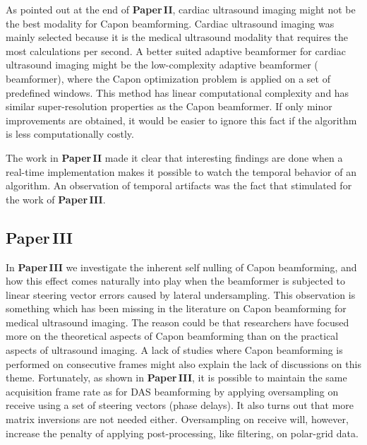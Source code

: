 As pointed out at the end of \textbf{Paper\,II}, cardiac ultrasound imaging might not be the best modality for Capon beamforming. Cardiac ultrasound imaging was mainly selected because it is the medical ultrasound modality that requires the most calculations per second. A better suited adaptive beamformer for cardiac ultrasound imaging might be the low-complexity adaptive beamformer ( beamformer), where the Capon optimization problem is applied on a set of predefined windows. This method has linear computational complexity and has similar super-resolution properties as the Capon beamformer. If only minor improvements are obtained, it would be easier to ignore this fact if the algorithm is less computationally costly. %

The work in \textbf{Paper\,II} made it clear that interesting findings are done when a real-time implementation makes it possible to watch the temporal behavior of an algorithm. An observation of temporal artifacts was the fact that stimulated for the work of \textbf{Paper\,III}. 

\subsection{Paper\,III}
In \textbf{Paper\,III} we investigate the inherent self nulling of Capon beamforming, and how this effect comes naturally into play when the beamformer is subjected to linear steering vector errors caused by lateral undersampling. This observation is something which has been missing in the literature on Capon beamforming for medical ultrasound imaging. The reason could be that researchers have focused more on the theoretical aspects of Capon beamforming than on the practical aspects of ultrasound imaging. A lack of studies where Capon beamforming is performed on consecutive frames might also explain the lack of discussions on this theme. Fortunately, as shown in \textbf{Paper\,III}, it is possible to maintain the same acquisition frame rate as for DAS beamforming by applying oversampling on receive using a set of steering vectors (phase delays). It also turns out that more matrix inversions are not needed either. Oversampling on receive will, however,  increase the penalty of applying post-processing, like filtering,  on polar-grid data. %

